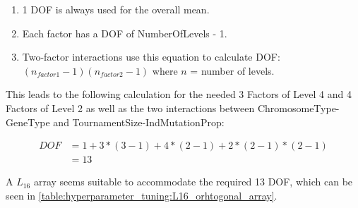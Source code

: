 \begin{enumerate}
	\item 1 DOF is always used for the overall mean. 
	\item Each factor has a DOF of NumberOfLevels - 1.
	\item Two-factor interactions use this equation to calculate DOF: $(n_{factor1} - 1)(n_{factor2} - 1)$ where $n$ = number of levels.
\end{enumerate}


This leads to the following calculation for the needed 3 Factors of Level 4 and 4 Factors of Level 2 as well as the two interactions between ChromosomeType-GeneType and TournamentSize-IndMutationProp:

\begin{equation} \label{DOF}
	\begin{split}
		DOF & = 1 + 3 * (3 - 1) + 4 * (2 - 1) + 2 * (2 - 1) * (2 - 1) \\
		& = 13
	\end{split}
\end{equation}

A $L_{16}$ array seems suitable to accommodate the required 13 DOF, which can be seen in \ref{table:hyperparameter_tuning:L16_orhtogonal_array}.


